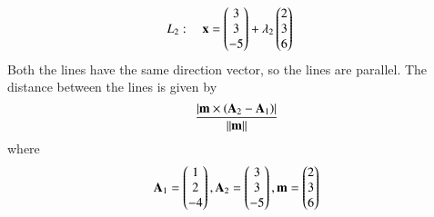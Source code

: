 \begin{enumerate}[label=\arabic*.,ref=\thesubsection.\theenumi]
\begin{align}
L_2: \quad \mathbf{x} &= \begin{pmatrix}3\\3\\-5\end{pmatrix} + \lambda_2\begin{pmatrix}2 \\ 3 \\6\end{pmatrix}
\end{align}
\label{prob:line_dist_parallel}
%
\solution Both the lines have the same direction vector, so the lines are parallel. The distance between the lines is given by 
%
\begin{align}
\label{eq:line_dist_parallel}
\frac{\left\vert\mathbf{m}\times \left(\mathbf{A}_2-
\mathbf{A}_1\right)\right\vert}{\left\lVert\mathbf{m}\right\rVert}
\end{align}
%
where 
%
\begin{align}
\mathbf{A}_1 = \begin{pmatrix}1\\2\\-4\end{pmatrix},
\mathbf{A}_2 = \begin{pmatrix}3\\3\\-5\end{pmatrix},
\mathbf{m}=\begin{pmatrix}2 \\ 3 \\6\end{pmatrix}
\end{align}
%


\end{enumerate}
